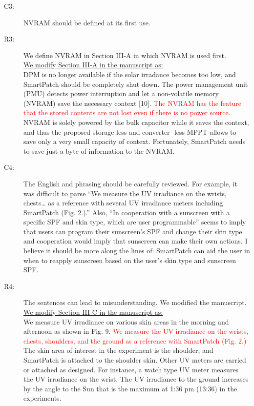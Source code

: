 \documentclass[onecolumn]{IEEEconf}
\begin{document}
\begin{description}
\item [C3: ] NVRAM should be defined at its first use.
\item [R3: ] We define NVRAM in Section III-A in which NVRAM is used first.\\

\underline{We modify Section III-A in the manuscript as:}\\
DPM is no longer available if the solar irradance becomes too low, and SmartPatch should be completely shut down. The power management unit (PMU) detects power interruption and let a non-volatile memory (NVRAM) save the necessary context [10]. \textcolor{red}{The NVRAM has the feature that the stored contents are not lost even if there is no power source.} NVRAM is solely powered by the bulk capacitor while it saves the context, and thus the proposed storage-less and converter- less MPPT allows to save only a very small capacity of context. Fortunately, SmartPatch needs to save just a byte of information to the NVRAM.
~\\

\item [C4:] The English and phrasing should be carefully reviewed. For example, it was difficult to parse “We measure the UV irradiance on the wrists, chests… as a reference with several UV irradiance meters including SmartPatch (Fig. 2.).” Also, “In cooperation with a sunscreen with a specific SPF and skin type, which are user programmable” seems to imply that users can program their sunscreen’s SPF and change their skin type and cooperation would imply that sunscreen can make their own actions. I believe it should be more along the lines of: SmartPatch can aid the user in when to reapply sunscreen based on the user’s skin type and sunscreen SPF.
\item [R4: ] The sentences can lead to misunderstanding. We modified the manuscript. \\

\underline{We modify Section III-C in the manuscript as:}\\
We measure UV irradiance on various skin areas in the morning and afternoon as shown in Fig. 9. \textcolor{red}{We measure the UV irradiance on the wrists, chests, shoulders, and the ground as a reference with SmartPatch (Fig. 2.)} The skin area of interest in the experiment is the shoulder, and SmartPatch is attached to the shoulder skin. Other UV meters are carried or attached as designed. For instance, a watch type UV meter measures the UV irradiance on the wrist. The UV irradiance to the ground increases by the angle to the Sun that is the maximum at 1:36 pm (13:36) in the experiments.\\


\end{description}
\end{document}
